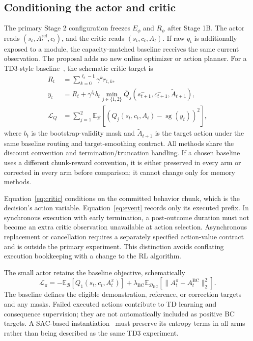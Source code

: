 \documentclass[10pt,letterpaper]{article}
\newcommand{\sg}{\operatorname{sg}}
\newcommand{\D}{\mathcal{D}}
\newcommand{\E}{\mathbb{E}}
\begin{document}
\subsection{Conditioning the actor and critic}
The primary Stage 2 configuration freezes $E_\phi$ and $R_\psi$ after Stage 1B. The actor reads $(s_t,A_t^{\mathrm{ref}},c_t)$, and the critic reads $(s_t,c_t,A_t)$. If raw $q_t$ is additionally exposed to a module, the capacity-matched baseline receives the same current observation. The proposal adds no new online optimizer or action planner. For a TD3-style baseline~\citep{td3}, the schematic critic target is
\begin{align}
 R_t&=\sum_{k=0}^{\ell_t-1}\gamma^k r_{t,k},\nonumber\\
 y_t&=R_t+\gamma^{\ell_t}b_t\min_{j\in\{1,2\}}
    \bar Q_j(s_{t+1}^{-},c_{t+1}^{-},\widetilde A_{t+1}),
 \label{eq:target}\\
 \mathcal{L}_Q&=\sum_{j=1}^{2}\E_{\mathcal{B}}
       \left[(Q_j(s_t,c_t,A_t)-\sg(y_t))^2\right],
 \label{eq:critic}
\end{align}
where $b_t$ is the bootstrap-validity mask and $\widetilde A_{t+1}$ is the target action under the same baseline routing and target-smoothing contract. All methods share the discount convention and termination/truncation handling. If a chosen baseline uses a different chunk-reward convention, it is either preserved in every arm or corrected in every arm before comparison; it cannot change only for memory methods.

Equation~\ref{eq:critic} conditions on the committed behavior chunk, which is the decision's action variable. Equation~\ref{eq:event} records only its executed prefix. In synchronous execution with early termination, a post-outcome duration must not become an extra critic observation unavailable at action selection. Asynchronous replacement or cancellation requires a separately specified action-value contract and is outside the primary experiment. This distinction avoids conflating execution bookkeeping with a change to the RL algorithm.

The small actor retains the baseline objective, schematically
\begin{equation}
 \mathcal{L}_{\pi}=-\E_{\mathcal B}[Q_1(s_t,c_t,A_t^{\pi})]
     +\lambda_{\mathrm{BC}}\E_{\D_{\mathrm{BC}}}
            [\|A_t^{\pi}-A_t^{\mathrm{BC}}\|_2^2].
 \label{eq:actor}
\end{equation}
The baseline defines the eligible demonstration, reference, or correction targets and any masks. Failed executed actions contribute to TD learning and consequence supervision; they are not automatically included as positive BC targets. A SAC-based instantiation~\citep{sac} must preserve its entropy terms in all arms rather than being described as the same TD3 experiment.
\end{document}
